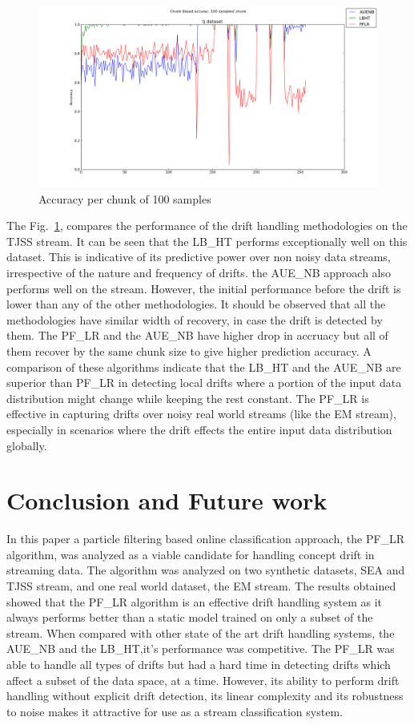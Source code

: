 \documentclass[conference]{IEEEtran}
\begin{document}
\begin{figure}
\captionsetup{justification=centering}
\centering
\includegraphics[scale=0.22]{fig/chunk_100_drifthandlers.png}
\caption{Accuracy per chunk of 100 samples}
\label{fig:chunk_dh_100} 
\end{figure}

The Fig.~\ref{fig:chunk_dh_100}, compares the performance of the drift handling methodologies on the TJSS stream. It can be seen that the LB\_HT performs exceptionally well on this dataset. This is indicative of its predictive power over non noisy data streams, irrespective of the nature and frequency of drifts. the AUE\_NB approach also performs well on the stream. However, the initial performance before the drift is lower than any of the other methodologies. It should be observed that all the methodologies have similar width of recovery, in case the drift is detected by them. The PF\_LR and the AUE\_NB have higher drop in accruacy but all of them recover by the same chunk size to give higher prediction accuracy. A comparison of these algorithms indicate that the LB\_HT and the AUE\_NB are superior than PF\_LR in detecting local drifts where a portion of the input data distribution might change while keeping the rest constant. The PF\_LR is effective in capturing drifts over noisy real world streams (like the EM stream), especially in scenarios where the drift effects the entire input data distribution globally. 


\section{Conclusion and Future work}
In this paper a particle filtering based online classification approach, the PF\_LR algorithm, was analyzed as a viable candidate for handling concept drift in streaming data. The algorithm was analyzed on two synthetic datasets, SEA and TJSS stream, and one real world dataset, the EM stream. The results obtained showed that the PF\_LR algorithm is an effective drift handling system as it always performs better than a static model trained on only a subset of the stream. When compared with other state of the art drift handling systems, the AUE\_NB and the LB\_HT,it's performance was competitive. The PF\_LR was able to handle all types of drifts but had a hard time in detecting drifts which affect a subset of the data space, at a time. However, its ability to perform drift handling without explicit drift detection, its linear complexity and its robustness to noise makes it attractive for use as a stream classification system. 
\end{document}
